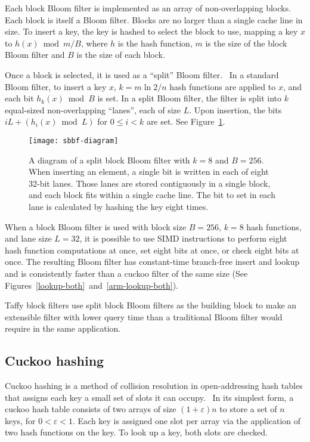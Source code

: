 \documentclass[sigconf]{acmart}
\begin{document}
Each block Bloom filter is implemented as an array of non-overlapping blocks.
Each block is itself a Bloom filter.
Blocks are no larger than a single cache line in size.
To insert a key, the key is hashed to select the block to use, mapping a key $x$ to $h(x) \bmod m/B$, where $h$ is the hash function, $m$ is the size of the block Bloom filter and $B$ is the size of each block.

Once a block is selected, it is used as a ``split'' Bloom filter.~\cite{split-bloom}
In a standard Bloom filter, to insert a key $x$, $k = m \ln 2 / n$ hash functions are applied to $x$, and each bit $h_k(x) \bmod B$ is set.
In a split Bloom filter, the filter is split into $k$ equal-sized non-overlapping ``lanes'', each of size $L$.
Upon insertion, the bits $i L + (h_i(x) \bmod L)$ for $0 \le i < k$ are set.
See Figure~\ref{sbbf-diagram}.

\begin{figure}
  \texttt{[image: sbbf-diagram]}
\caption{\label{sbbf-diagram}
A diagram of a split block Bloom filter with $k = 8$ and $B = 256$.
When inserting an element, a single bit is written in each of eight 32-bit lanes.
Those lanes are stored contiguously in a single block, and each block fits within a single cache line.
The bit to set in each lane is calculated by hashing the key eight times.
}
\end{figure}

When a block Bloom filter is used with block size $B = 256$, $k = 8$ hash functions, and lane size $L = 32$, it is possible to use SIMD instructions to perform eight hash function computations at once, set eight bits at once, or check eight bits at once.
The resulting Bloom filter has constant-time branch-free insert and lookup and is consistently faster than a cuckoo filter of the same size (See Figures~\ref{lookup-both}~and~\ref{arm-lookup-both}).~\cite{cuckoo-filter-github,ultra-fast,overtakes,impala-bloom}

Taffy block filters use split block Bloom filters as the building block to make an extensible filter with lower query time than a traditional Bloom filter would require in the same application.

\subsection{Cuckoo hashing}

Cuckoo hashing is a method of collision resolution in open-address\-ing hash tables that assigns each key a small set of slots it can occupy.~\cite{cuckoo-journal}
In its simplest form, a cuckoo hash table consists of two arrays of size $(1 + \varepsilon)n$ to store a set of $n$ keys, for $0 < \varepsilon < 1$.
Each key is assigned one slot per array via the application of two hash functions on the key.
To look up a key, both slots are checked.
\end{document}

